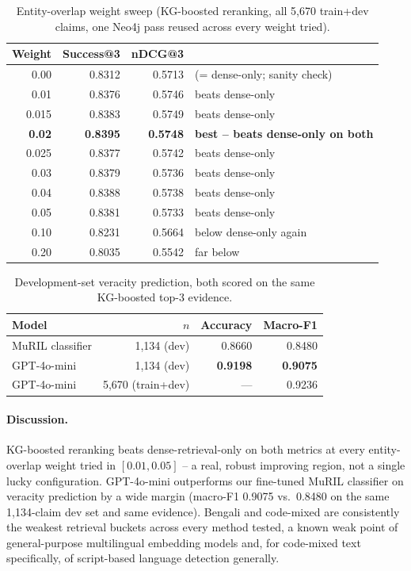 \documentclass[
]{ceurart}
\begin{document}
\begin{table}[h]
  \centering
  \caption{Entity-overlap weight sweep (KG-boosted reranking, all
    5{,}670 train+dev claims, one Neo4j pass reused across every weight
    tried).}
  \label{tab:sweep}
  \small
  \begin{tabular}{@{}rrrl@{}}
    \toprule
    Weight & Success@3 & nDCG@3 & \\
    \midrule
    0.00 & 0.8312 & 0.5713 & (= dense-only; sanity check) \\
    0.01 & 0.8376 & 0.5746 & beats dense-only \\
    0.015 & 0.8383 & 0.5749 & beats dense-only \\
    \textbf{0.02} & \textbf{0.8395} & \textbf{0.5748} & \textbf{best -- beats dense-only on both} \\
    0.025 & 0.8377 & 0.5742 & beats dense-only \\
    0.03 & 0.8379 & 0.5736 & beats dense-only \\
    0.04 & 0.8388 & 0.5738 & beats dense-only \\
    0.05 & 0.8381 & 0.5733 & beats dense-only \\
    0.10 & 0.8231 & 0.5664 & below dense-only again \\
    0.20 & 0.8035 & 0.5542 & far below \\
    \bottomrule
  \end{tabular}
\end{table}

\begin{table}[h]
  \centering
  \caption{Development-set veracity prediction, both scored on the same
    KG-boosted top-3 evidence.}
  \label{tab:st1-veracity}
  \small
  \begin{tabular}{@{}lrrr@{}}
    \toprule
    Model & $n$ & Accuracy & Macro-F1 \\
    \midrule
    MuRIL classifier & 1{,}134 (dev) & 0.8660 & 0.8480 \\
    GPT-4o-mini & 1{,}134 (dev) & \textbf{0.9198} & \textbf{0.9075} \\
    GPT-4o-mini & 5{,}670 (train+dev) & --- & 0.9236 \\
    \bottomrule
  \end{tabular}
\end{table}

\paragraph{Discussion.}
KG-boosted reranking beats dense-retrieval-only on both metrics at
every entity-overlap weight tried in $[0.01, 0.05]$ -- a real, robust
improving region, not a single lucky configuration. GPT-4o-mini
outperforms our fine-tuned MuRIL classifier on veracity prediction by a
wide margin (macro-F1 0.9075 vs.\ 0.8480 on the same 1{,}134-claim dev
set and same evidence). Bengali and code-mixed are consistently the
weakest retrieval buckets across every method tested, a known weak
point of general-purpose multilingual embedding models and, for
code-mixed text specifically, of script-based language detection
generally.
\end{document}

